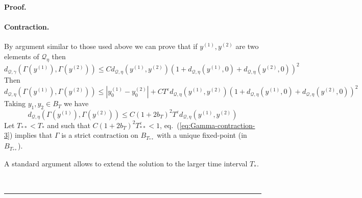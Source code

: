 \documentclass[a4paper,12pt,reqno]{article}
\newcommand{\eps}{\varepsilon}
\newcommand{\QQ}{\mathcal{Q}}
\newenvironment{proof}[1][Proof]{\textbf{#1.} }{\ \rule{0.5em}{0.5em}}
\begin{document}
\begin{proof}
\paragraph{Contraction.}
By argument similar to those used above we can prove that if $y^{(1)},
y^{(2)}$ are two elements of $\QQ_{\eta}$ then
\begin{equation}
  \label{eq:Gamma-contraction}
  d_{\QQ,\gamma}(\Gamma(y^{(1)}),\Gamma(y^{(2)})) \le C d_{\QQ,\eta}(y^{(1)},y^{(2)}) (1+d_{\QQ,\eta}(y^{(1)},0)+d_{\QQ,\eta}(y^{(2)},0))^2 
\end{equation}
Then 
\begin{equation}
  \label{eq:Gamma-contraction-2}
   d_{\QQ,\eta}(\Gamma(y^{(1)}),\Gamma(y^{(2)})) \le
  |y^{(1)}_0-y^{(2)}_0| 
  + C T^\eps  d_{\QQ,\eta}(y^{(1)},y^{(2)}) (1+ d_{\QQ,\eta}(y^{(1)},0)+ d_{\QQ,\eta}(y^{(2)},0))^2 
\end{equation}
Taking $y_1,y_2 \in B_T$ we have
\begin{equation}
  \label{eq:Gamma-contraction-3}
  d_{\QQ,\eta}(\Gamma(y^{(1)}),\Gamma(y^{(2)})) \le
   C (1+2 b_T)^2 T^\eps d_{\QQ,\eta}(y^{(1)},y^{(2)})
\end{equation}
Let $T_{**} < T_*$ and such that  $C (1+2 b_T)^2 T_{**}^\eps < 1$, eq.~(\ref{eq:Gamma-contraction-3}) implies that
$\Gamma$ is a strict contraction on $B_{T_{**}}$ with a unique fixed-point
(in $B_{T_{**}}$).

A standard argument allows to extend the solution 
to the larger time interval $T_*$.


\end{proof}
\end{document}
